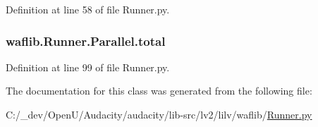 Definition at line 58 of file Runner.\+py.

\subsubsection[{\texorpdfstring{total}{total}}]{\setlength{\rightskip}{0pt plus 5cm}waflib.\+Runner.\+Parallel.\+total}\hypertarget{classwaflib_1_1_runner_1_1_parallel_ac3be316b11ba963fdd757cb7c1540750}{}\label{classwaflib_1_1_runner_1_1_parallel_ac3be316b11ba963fdd757cb7c1540750}


Definition at line 99 of file Runner.\+py.



The documentation for this class was generated from the following file\+:\begin{DoxyCompactItemize}
\item 
C\+:/\+\_\+dev/\+Open\+U/\+Audacity/audacity/lib-\/src/lv2/lilv/waflib/\hyperlink{lilv_2waflib_2_runner_8py}{Runner.\+py}\end{DoxyCompactItemize}
